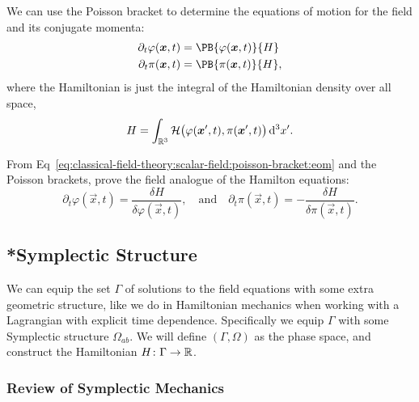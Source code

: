 We can use the Poisson bracket to determine the equations of motion for
the field and its conjugate momenta:
\begin{subequations}\label{eq:classical-field-theory:scalar-field:poisson-bracket:eom}
\begin{align}
\partial_{t}\varphi(\vec{x},t) &= \PB{\varphi(\vec{x},t)}{H}\\
\partial_{t}\pi(\vec{x},t)     &= \PB{\pi(\vec{x},t)}{H},
\end{align}
\end{subequations}
where the Hamiltonian is just the integral of the Hamiltonian density
over all space,
\begin{equation}
H = \int_{\mathbb{R}^{3}}\mathcal{H}\bigl(\varphi(\boldsymbol{x}',t), \pi(\boldsymbol{x}',t)\bigr)\,\mathrm{d}^{3}x'.
\end{equation}

\begin{exercise}
From Eq~\eqref{eq:classical-field-theory:scalar-field:poisson-bracket:eom}
and the Poisson brackets, prove the field analogue of the Hamilton equations:
\begin{equation}
\partial_{t}\varphi(\vec{x},t) = \frac{\delta H}{\delta\varphi(\vec{x},t)},
\quad\mbox{and}\quad
\partial_{t}\pi(\vec{x},t) = -\frac{\delta H}{\delta\pi(\vec{x},t)}.
\end{equation}
\end{exercise}

\subsection{*Symplectic Structure}

\M
We can equip the set $\Gamma$ of solutions to the field equations with
some extra geometric structure, like we do in Hamiltonian
mechanics when working with a Lagrangian with explicit time dependence.
Specifically we equip $\Gamma$ with some Symplectic structure $\Omega_{ab}$.
We will define $(\Gamma,\Omega)$ as the phase space, and construct the
Hamiltonian $H\colon\Gamma\to\mathbb{R}$.

\subsubsection*{Review of Symplectic Mechanics}

